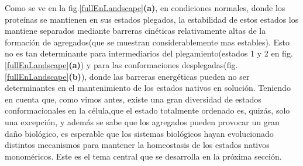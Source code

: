 Como se ve en la fig.\ref{fullEnLandscape}\textbf{(a)}, en condiciones normales, donde los proteínas se mantienen en sus estados plegados, 
la estabilidad de estos estados los mantiene separados mediante barreras cinéticas relativamente altas de la formación de agregados(que se muestran considerablemente mas estables).
Esto no es tan determinante para intermediarios del plegamiento(estados 1 y 2 en fig. \ref{fullEnLandscape}\textbf{(a)}) y para las conformaciones desplegadas(fig. \ref{fullEnLandscape}\textbf{(b)}), 
donde las barreras energéticas pueden no ser determinantes en el mantenimiento de los estados nativos en solución.
Teniendo en cuenta que, como vimos antes, existe una gran diversidad de estados conformacionales en la célula,que el estado totalmente ordenado es, quizás, solo una excepción, y además se sabe que los agregados pueden provocar un gran daño biológico,
es esperable que los sistemas biológicos hayan evolucionado distintos mecanismos para mantener la homeostasis de los estados nativos monoméricos.
Este es el tema central que se desarrolla en la próxima sección.




% 
% 
% 
% 
% 
% 





